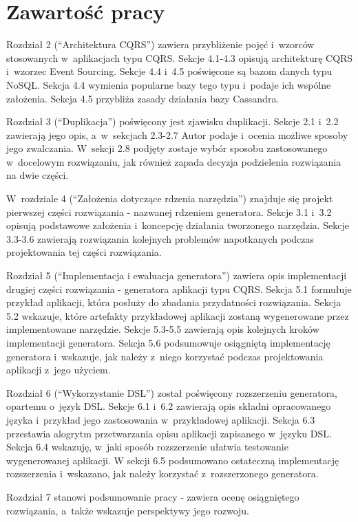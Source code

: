 \section{Zawartość pracy}

Rozdział 2 (``Architektura CQRS'') zawiera przybliżenie pojęć i~wzorców stosowanych w~aplikacjach typu CQRS.
Sekcje 4.1-4.3 opisują architekturę CQRS i~wzorzec Event Sourcing.
Sekcje 4.4 i~4.5 poświęcone są bazom danych typu NoSQL.
Sekcja 4.4 wymienia popularne bazy tego typu i~podaje ich wspólne założenia.
Sekcja 4.5 przybliża zasady działania bazy Cassandra.

Rozdział 3 (``Duplikacja'') poświęcony jest zjawisku duplikacji.
Sekcje 2.1 i~2.2 zawierają jego opis, a~w~sekcjach 2.3-2.7 Autor podaje i~ocenia możliwe sposoby jego zwalczania.
W~sekcji 2.8 podjęty zostaje wybór sposobu zastosowanego w~docelowym rozwiązaniu, jak również zapada decyzja podzielenia rozwiązania na dwie części.

W~rozdziale 4 (``Założenia dotyczące rdzenia narzędzia'') znajduje się projekt pierwszej części rozwiązania - nazwanej rdzeniem generatora.
Sekcje 3.1 i~3.2 opisują podstawowe założenia i~koncepcję działania tworzonego narzędzia.
Sekcje 3.3-3.6 zawierają rozwiązania kolejnych problemów napotkanych podczas projektowania tej części rozwiązania.

Rozdział 5 (``Implementacja i ewaluacja generatora'') zawiera opis implementacji drugiej części rozwiązania - generatora aplikacji typu CQRS.
Sekcja 5.1 formułuje przykład aplikacji, która posłuży do zbadania przydatności rozwiązania.
Sekcja 5.2 wskazuje, które artefakty przykładowej aplikacji zostaną wygenerowane przez implementowane narzędzie.
Sekcje 5.3-5.5 zawierają opis kolejnych kroków implementacji generatora.
Sekcja 5.6 podsumowuje osiągniętą implementację generatora i~wskazuje, jak należy z~niego korzystać podczas projektowania aplikacji z~jego użyciem.

Rozdział 6 (``Wykorzystanie DSL'') został poświęcony rozszerzeniu generatora, opartemu o~język DSL.
Sekcje 6.1 i~6.2 zawierają opis składni opracowanego języka i~przykład jego zastosowania w~przykładowej aplikacji.
Sekcja 6.3 przestawia alogrytm przetwarzania opisu aplikacji zapisanego w~języku DSL.
Sekcja 6.4 wskazuję, w~jaki sposób rozszerzenie ułatwia testowanie wygenerowanej aplikacji.
W sekcji 6.5 podsumowano ostateczną implementację rozszerzenia i~wskazano, jak należy korzystać z~rozszerzonego generatora.

Rozdział 7 stanowi podsumowanie pracy - zawiera ocenę osiągniętego rozwiązania, a~także wskazuje perspektywy jego rozwoju.
